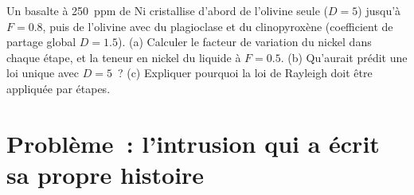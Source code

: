 \begin{exercise}[$\star\star\star$]\label{exo:b2:magmatic-differentiation:12}
Un basalte à \qty{250}{ppm} de Ni cristallise d'abord de l'olivine seule ($D = 5$) jusqu'à
$F = 0.8$, puis de l'olivine avec du plagioclase et du clinopyroxène (coefficient de partage global $D = 1.5$). (a) Calculer le facteur de variation
du nickel dans chaque étape, et la teneur en nickel du liquide à $F = 0.5$.
(b) Qu'aurait prédit une loi unique avec $D = 5$~?
(c) Expliquer pourquoi la loi de Rayleigh doit être appliquée par étapes.
\end{exercise}

\section{Problème~: l'intrusion qui a écrit sa propre histoire}

